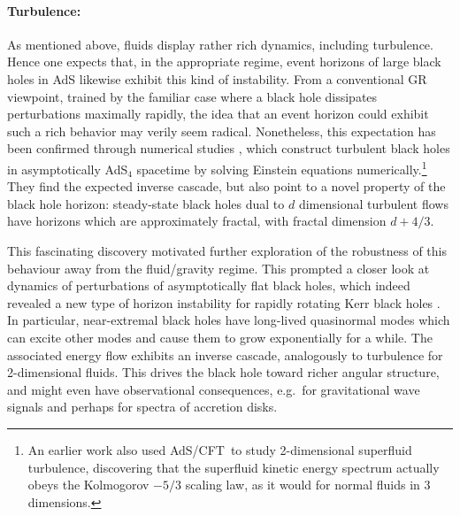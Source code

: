 \documentclass[12pt]{article}
\def\AC{AdS/CFT}
\begin{document}
\paragraph{Turbulence:}  %
As mentioned above,
fluids display rather rich dynamics, including turbulence.
Hence one expects that, in the appropriate regime, event horizons of large black holes in AdS likewise exhibit this kind of instability.  From a conventional GR viewpoint, trained by the familiar case where a black hole dissipates perturbations maximally rapidly, 
the idea that an  event horizon could exhibit such a rich behavior may verily seem  radical.   Nonetheless, this expectation has been confirmed through numerical studies \cite{Adams:2013vsa}, which construct turbulent black holes in asymptotically AdS$_4$ spacetime by  solving Einstein equations numerically.\footnote{
An earlier work \cite{Adams:2012pj} also used \AC\ to study 2-dimensional superfluid turbulence, discovering that the superfluid kinetic energy spectrum actually obeys the Kolmogorov $-5/3$ scaling law, as it would for normal fluids in 3 dimensions.
}  They find the expected inverse cascade, but also point to a novel property of the black hole horizon:  steady-state black holes dual to $d$ dimensional turbulent flows have horizons which are approximately fractal,  with fractal dimension $d + 4/3$.


This fascinating discovery motivated further exploration of the  robustness of this behaviour away from the fluid/gravity regime.  This prompted a closer look at dynamics of perturbations of asymptotically flat black holes, which indeed revealed a new type of horizon instability for rapidly rotating Kerr black holes \cite{Yang:2014tla}.  In particular, near-extremal black holes have long-lived quasinormal modes which can excite other modes and cause them to grow exponentially for a while.  The associated energy flow exhibits an inverse cascade, analogously to turbulence for 2-dimensional fluids.  This drives the black hole toward richer angular structure, and might even have observational consequences, e.g.\ for gravitational wave signals and perhaps for spectra of accretion disks. 
\end{document}
